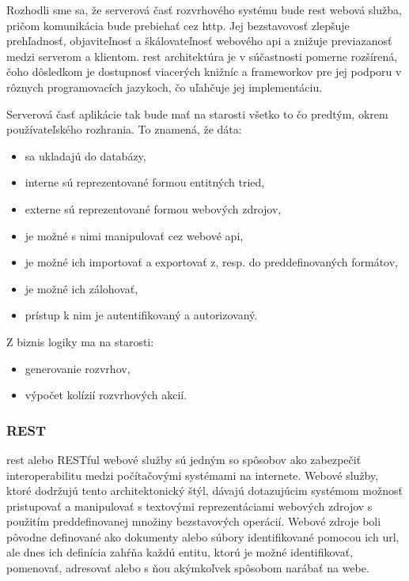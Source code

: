 Rozhodli sme sa, že serverová časť rozvrhového systému bude \acrshort{rest}
webová služba, pričom komunikácia bude prebiehať cez \acrshort{http}. Jej
bezstavovosť zlepšuje prehľadnosť, objaviteľnosť a škálovateľnosť webového
\acrshort{api} a znižuje previazanosť medzi serverom a klientom. \acrshort{rest}
architektúra je v súčastnosti pomerne rozšírená, čoho dôsledkom je dostupnosť
viacerých knižníc a frameworkov pre jej podporu v rôznych programovacích
jazykoch, čo uľahčuje jej implementáciu.

Serverová časť aplikácie tak bude mať na starosti všetko to čo predtým, okrem
používateľského rozhrania. To znamená, že dáta:

\begin{itemize}
\item sa ukladajú do databázy,
\item interne sú reprezentované formou entitných tried,
\item externe sú reprezentované formou webových zdrojov,
\item je možné s nimi manipulovať cez webové \acrshort{api},
\item je možné ich importovať a exportovať z, resp. do preddefinovaných
  formátov,
\item je možné ich zálohovať,
\item prístup k nim je autentifikovaný a autorizovaný.
\end{itemize}

Z biznis logiky ma na starosti:

\begin{itemize}
\item generovanie rozvrhov,
\item výpočet kolízií rozvrhových akcií.
\end{itemize}

\subsubsection{REST}
\label{subsubsec:rest}

\acrfull{rest} alebo RESTful webové služby sú jedným so spôsobov ako zabezpečiť
interoperabilitu medzi počítačovými systémami na internete. Webové služby, ktoré
dodržujú tento architektonický štýl, dávajú dotazujúcim systémom možnosť
pristupovať a manipulovať s textovými reprezentáciami webových zdrojov s
použitím preddefinovanej množiny bezstavových operácií. Webové zdroje boli
pôvodne definované ako dokumenty alebo súbory identifikované pomocou ich
\acrshort{url}, ale dnes ich definícia zahŕňa každú entitu, ktorú je možné
identifikovať, pomenovať, adresovať alebo s ňou akýmkoľvek spôsobom narábať na
webe.

